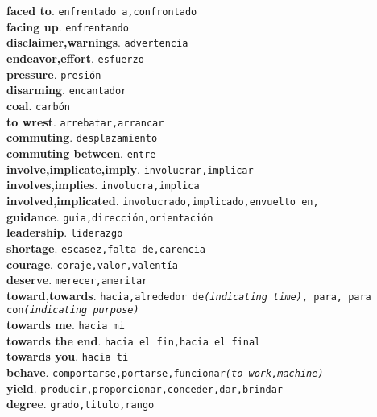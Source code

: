 \documentclass[twocolumn]{article}
\begin{document}
	\textsf{\textbf{faced to}}. \texttt{enfrentado a,confrontado}\\
	\textsf{\textbf{facing up}}. \texttt{enfrentando}\\
	\textsf{\textbf{disclaimer,warnings}}. \texttt{advertencia}\\
	\textsf{\textbf{endeavor,effort}}. \texttt{esfuerzo}\\
	\textsf{\textbf{pressure}}. \texttt{presi\'on}\\
	\textsf{\textbf{disarming}}. \texttt{encantador}\\
	\textsf{\textbf{coal}}. \texttt{carb\'on}\\
	\textsf{\textbf{to wrest}}. \texttt{arrebatar,arrancar}\\
	\textsf{\textbf{commuting}}. \texttt{desplazamiento}\\
	\textsf{\textbf{commuting between}}. \texttt{entre}\\
	\textsf{\textbf{involve,implicate,imply}}. \texttt{involucrar,implicar}\\
	\textsf{\textbf{involves,implies}}. \texttt{involucra,implica}\\
	\textsf{\textbf{involved,implicated}}. \texttt{involucrado,implicado,envuelto en,}\\
	\textsf{\textbf{guidance}}. \texttt{guia,direcci\'on,orientaci\'on}\\
	\textsf{\textbf{leadership}}. \texttt{liderazgo}\\
	\textsf{\textbf{shortage}}. \texttt{escasez,falta de,carencia}\\
	\textsf{\textbf{courage}}. \texttt{coraje,valor,valent\'ia}\\
	\textsf{\textbf{deserve}}. \texttt{merecer,ameritar}\\
	\textsf{\textbf{toward,towards}}. \texttt{hacia,alrededor de{\scriptsize \textsl{(indicating time)}}, para, para con{\scriptsize \textsl{(indicating purpose)}}}\\
	\textsf{\textbf{towards me}}. \texttt{hacia mi}\\
	\textsf{\textbf{towards the end}}. \texttt{hacia el fin,hacia el final}\\
	\textsf{\textbf{towards you}}. \texttt{hacia ti}\\
	\textsf{\textbf{behave}}. \texttt{comportarse,portarse,funcionar{\scriptsize \textsl{(to work,machine)}}}\\
	\textsf{\textbf{yield}}. \texttt{producir,proporcionar,conceder,dar,brindar}\\
	\textsf{\textbf{degree}}. \texttt{grado,titulo,rango}\\
\end{document}
